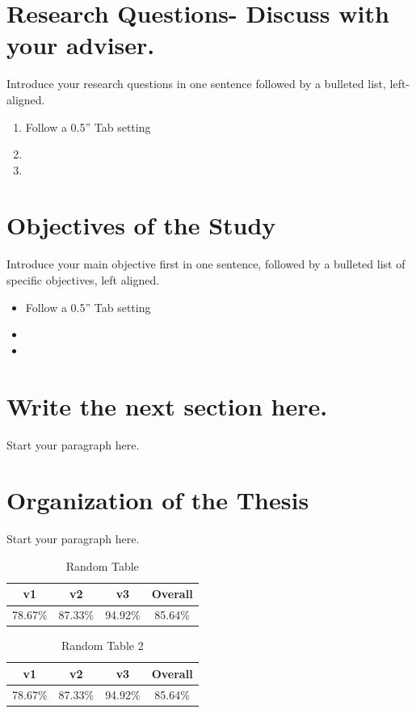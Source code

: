 \section{Research Questions- Discuss with your adviser.}
Introduce your research questions in one sentence followed by a bulleted list, left-aligned.

\begin{enumerate}
    \item Follow a 0.5” Tab setting
    \item
    \item
\end{enumerate}

\section{Objectives of the Study}
Introduce your main objective first in one sentence, followed by a bulleted list of specific objectives, left aligned.
\begin{itemize}
    \item Follow a 0.5” Tab setting
    \item
    \item
\end{itemize}

\section{Write the next section here.}
Start your paragraph here. 

\section{Organization of the Thesis}
Start your paragraph here. 


\begin{table}[ht]
  \caption[Random Table]{Random Table}
  \begin{center}
    \begin{tabular}{cccc}
      \hline \textbf{v1} & \textbf{v2} & \textbf{v3} & \textbf{Overall} \\ \hline
        78.67\% & 87.33\% & 94.92\% & 85.64\% \\ \hline
    \end{tabular}
  \end{center}
  \label{tab:random_table}
\end{table} 

\begin{table}[ht]
  \caption[Random Table 2]{Random Table 2}
  \begin{center}
    \begin{tabular}{cccc}
      \hline \textbf{v1} & \textbf{v2} & \textbf{v3} & \textbf{Overall} \\ \hline
        78.67\% & 87.33\% & 94.92\% & 85.64\% \\ \hline
    \end{tabular}
  \end{center}
  \label{tab:random_table_2}
\end{table} 

